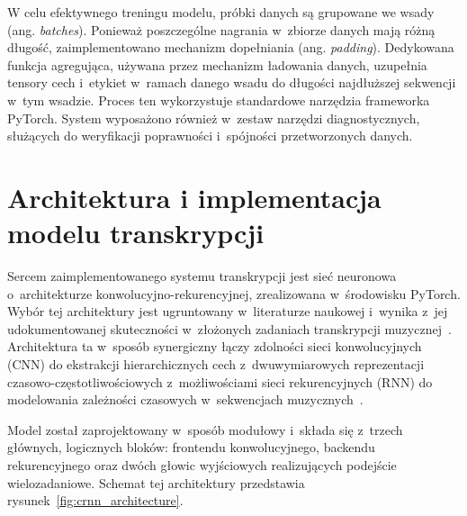 W celu efektywnego treningu modelu, próbki danych są grupowane we wsady (ang. \textit{batches}). Ponieważ poszczególne nagrania w~zbiorze danych mają różną długość, zaimplementowano mechanizm dopełniania (ang. \textit{padding}). Dedykowana funkcja agregująca, używana przez mechanizm ładowania danych, uzupełnia tensory cech i~etykiet w~ramach danego wsadu do długości najdłuższej sekwencji w~tym wsadzie. Proces ten wykorzystuje standardowe narzędzia frameworka PyTorch. System wyposażono również w~zestaw narzędzi diagnostycznych, służących do weryfikacji poprawności i~spójności przetworzonych danych.

\section{Architektura i implementacja modelu transkrypcji}
\label{sec:architektura_modelu_crnn}

Sercem zaimplementowanego systemu transkrypcji jest sieć neuronowa o~architekturze konwolucyjno-rekurencyjnej, zrealizowana w~środowisku PyTorch. Wybór tej architektury jest ugruntowany w~literaturze naukowej i~wynika z~jej udokumentowanej skuteczności w~złożonych zadaniach transkrypcji muzycznej~\autocite{Hawthorne2018Onsets}. Architektura ta w~sposób synergiczny łączy zdolności sieci konwolucyjnych (CNN) do ekstrakcji hierarchicznych cech z~dwuwymiarowych reprezentacji czasowo-częstotliwościowych z~możliwościami sieci rekurencyjnych (RNN) do modelowania zależności czasowych w~sekwencjach muzycznych~\autocite{Wiggins2019TabCNN}.

Model został zaprojektowany w~sposób modułowy i~składa się z~trzech głównych, logicznych bloków: frontendu konwolucyjnego, backendu rekurencyjnego oraz dwóch głowic wyjściowych realizujących podejście wielozadaniowe. Schemat tej architektury przedstawia rysunek~\ref{fig:crnn_architecture}.

